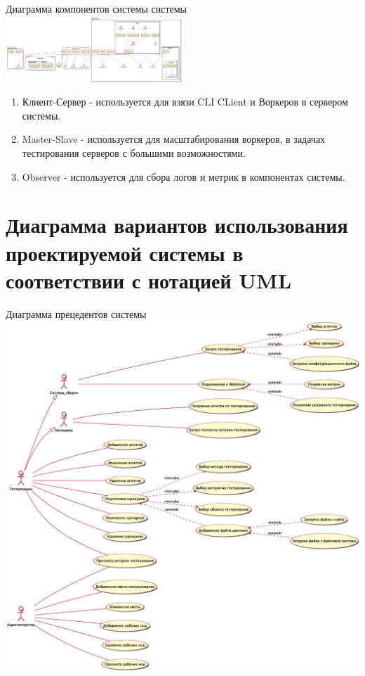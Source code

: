 \documentclass[PI,LAB]{HSEUniversity}
\begin{document}
\begin{FIGURE}[h]{Диаграмма компонентов системы системы{\tiny}\label{fig:example-figure}}
	\includegraphics[angle=90,width=0.5\textwidth]{out/diag/component/component}
\end{FIGURE}
\begin{enumerate}
	\item Клиент-Сервер - используется для взязи CLI CLient и Воркеров в сервером системы.
	\item Master-Slave - используется для масштабирования воркеров, в задачах тестирования серверов с большими возможностями.
	\item Observer - используется для сбора логов и метрик в компонентах системы.
\end{enumerate}







\chapter{Диаграмма вариантов использования проектируемой системы в соответствии с нотацией UML}

\begin{FIGURE}[h]{Диаграмма прецедентов системы{\tiny}\label{fig:example-figure}}
	\includegraphics[width=1\textwidth]{out/diag/use-case/use-case}
\end{FIGURE}
\end{document}
